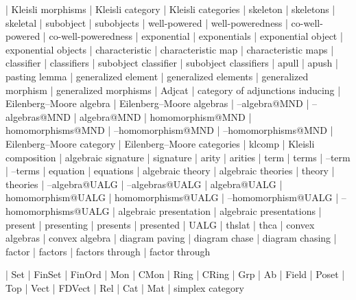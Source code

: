     |   Kleisli morphisms
    |   Kleisli category
    |   Kleisli categories
    |   skeleton
    |   skeletons
    |   skeletal
    |   subobject
    |   subobjects
    |   well-powered
    |   well-poweredness
    |   co-well-powered
    |   co-well-poweredness
    |   exponential
    |   exponentials
    |   exponential object
    |   exponential objects
    |   characteristic
    |   characteristic map
    |   characteristic maps
    |   classifier
    |   classifiers
    |   subobject classifier
    |   subobject classifiers
    |   apull
    |   apush
    |   pasting lemma
    |   generalized element
    |   generalized elements
    |   generalized morphism
    |   generalized morphisms
    |   Adjcat
    |   category of adjunctions inducing
    |   Eilenberg--Moore algebra
    |   Eilenberg--Moore algebras
    |   --algebra@MND
    |   --algebras@MND
    |   algebra@MND
    |   homomorphism@MND
    |   homomorphisms@MND
    |   --homomorphism@MND
    |   --homomorphisms@MND
    |   Eilenberg--Moore category
    |   Eilenberg--Moore categories
    |   klcomp
    |   Kleisli composition
    |   algebraic signature
    |   signature
    |   arity
    |   arities
    |   term
    |   terms
    |   --term
    |   --terms
    |   equation
    |   equations
    |   algebraic theory
    |   algebraic theories
    |   theory
    |   theories
    |   --algebra@UALG
    |   --algebras@UALG
    |   algebra@UALG
    |   homomorphism@UALG
    |   homomorphisms@UALG
    |   --homomorphism@UALG
    |   --homomorphisms@UALG
    |   algebraic presentation
    |   algebraic presentations
    |   present
    |   presenting
    |   presents
    |   presented
    |   UALG
    |   thslat
    |   thca
    |   convex algebras
    |   convex algebra
    |   diagram paving
    |   diagram chase
    |   diagram chasing
    |   factor
    |   factors
    |   factors through
    |   factor through


    |   Set
    |   FinSet
    |   FinOrd
    |   Mon
    |   CMon
    |   Ring
    |   CRing
    |   Grp
    |   Ab
    |   Field
    |   Poset
    |   Top
    |   Vect
    |   FDVect
    |   Rel
    |   Cat
    |   Mat
    |   simplex category
